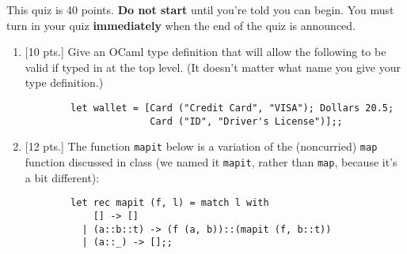 \documentclass[11pt]{article}
\begin{document}
  \hspace{\fill}%
  \nameblock

  \smallskip


  \vspace{-3mm}

    \noindent
    This quiz is 40 points.  \textbf{Do not start} until you're told you can
  begin.  You must turn in your quiz \textbf{immediately} when the end of
  the quiz is announced.

  \vspace{-2mm}

  \begin{enumerate}

    \addtolength{\itemsep}{20mm}

    \item {[10 pts.]} Give an OCaml type definition that will allow the
          following to be valid if typed in at the top level.  (It doesn't
          matter what name you give your type definition.)

          \medskip

          \begin{centering}

            \begin{BVerbatim}
        let wallet = [Card ("Credit Card", "VISA"); Dollars 20.5;
                      Card ("ID", "Driver's License")];;
            \end{BVerbatim}

          \end{centering}

          \medskip\smallskip


    \item {[12 pts.]} The function \texttt{mapit} below is a variation of
          the (noncurried) \texttt{map} function discussed in class (we named
          it \texttt{mapit}, rather than \texttt{map}, because it's a bit
          different):

          \smallskip

          \begin{centering}

            \begin{BVerbatim}
        let rec mapit (f, l) = match l with
            [] -> []
          | (a::b::t) -> (f (a, b))::(mapit (f, b::t))
          | (a::_) -> [];;
            \end{BVerbatim}


\end{centering}
\end{enumerate}
\end{document}
